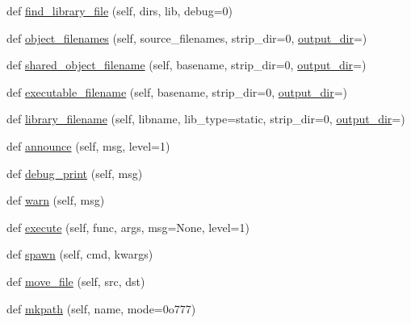 \begin{DoxyCompactItemize}
\item 
def \hyperlink{classsetuptools_1_1__distutils_1_1ccompiler_1_1CCompiler_ac6847d5d245ef5e07d47686adbe80448}{find\+\_\+library\+\_\+file} (self, dirs, lib, debug=0)
\item 
def \hyperlink{classsetuptools_1_1__distutils_1_1ccompiler_1_1CCompiler_a0dd4727234f365fb0fa0a13f74890cae}{object\+\_\+filenames} (self, source\+\_\+filenames, strip\+\_\+dir=0, \hyperlink{classsetuptools_1_1__distutils_1_1ccompiler_1_1CCompiler_a198fe320cb6d04ee5cf737d11e78a3d4}{output\+\_\+dir}=\textquotesingle{}\textquotesingle{})
\item 
def \hyperlink{classsetuptools_1_1__distutils_1_1ccompiler_1_1CCompiler_a303286472ce9c10ece3824345b836b13}{shared\+\_\+object\+\_\+filename} (self, basename, strip\+\_\+dir=0, \hyperlink{classsetuptools_1_1__distutils_1_1ccompiler_1_1CCompiler_a198fe320cb6d04ee5cf737d11e78a3d4}{output\+\_\+dir}=\textquotesingle{}\textquotesingle{})
\item 
def \hyperlink{classsetuptools_1_1__distutils_1_1ccompiler_1_1CCompiler_a52aabaabd2517962b374d03fce754043}{executable\+\_\+filename} (self, basename, strip\+\_\+dir=0, \hyperlink{classsetuptools_1_1__distutils_1_1ccompiler_1_1CCompiler_a198fe320cb6d04ee5cf737d11e78a3d4}{output\+\_\+dir}=\textquotesingle{}\textquotesingle{})
\item 
def \hyperlink{classsetuptools_1_1__distutils_1_1ccompiler_1_1CCompiler_a8e7dc497b0dbe3321ea2b28bc7f90302}{library\+\_\+filename} (self, libname, lib\+\_\+type=\textquotesingle{}static\textquotesingle{}, strip\+\_\+dir=0, \hyperlink{classsetuptools_1_1__distutils_1_1ccompiler_1_1CCompiler_a198fe320cb6d04ee5cf737d11e78a3d4}{output\+\_\+dir}=\textquotesingle{}\textquotesingle{})
\item 
def \hyperlink{classsetuptools_1_1__distutils_1_1ccompiler_1_1CCompiler_a501761e2a8ba78e759bf2242efe4ba54}{announce} (self, msg, level=1)
\item 
def \hyperlink{classsetuptools_1_1__distutils_1_1ccompiler_1_1CCompiler_a961d966d875401f72e477adcd73b3e10}{debug\+\_\+print} (self, msg)
\item 
def \hyperlink{classsetuptools_1_1__distutils_1_1ccompiler_1_1CCompiler_a05053eb5be68cf2f96df1c6e7acf29ff}{warn} (self, msg)
\item 
def \hyperlink{classsetuptools_1_1__distutils_1_1ccompiler_1_1CCompiler_a059c30925767dc96430ad63008871ac1}{execute} (self, func, args, msg=None, level=1)
\item 
def \hyperlink{classsetuptools_1_1__distutils_1_1ccompiler_1_1CCompiler_a22d0dec91faf7af4b714664547c9efd7}{spawn} (self, cmd, kwargs)
\item 
def \hyperlink{classsetuptools_1_1__distutils_1_1ccompiler_1_1CCompiler_ab1843deea6a6d898e0efcbb272381710}{move\+\_\+file} (self, src, dst)
\item 
def \hyperlink{classsetuptools_1_1__distutils_1_1ccompiler_1_1CCompiler_ab410541aef9ab8805ec1ac1632d55186}{mkpath} (self, name, mode=0o777)
\end{DoxyCompactItemize}
